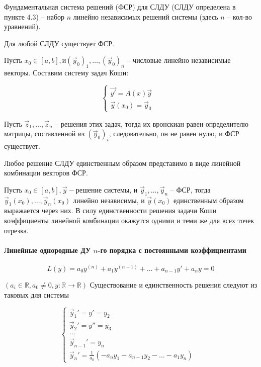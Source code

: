 \Def Фундаментальная система решений (ФСР) для СЛДУ (СЛДУ определена в пункте 4.3) -- набор $n$ линейно независимых решений системы (здесь $n$ -- кол-во уравнений).

\Lemma  Для любой СЛДУ существует ФСР.

\Proof Пусть $x_0 \in [a, b], \text{и} (\vec{y}_0)_1, \ldots , (\vec{y}_0)_n$ -- числовые линейно независимые векторы. Составим систему задач Коши:

\begin{equation*}
    \begin{cases}
        \vec{y'} = A(x)\vec{y}&\\
        \vec{y}(x_0) = \vec{y}_0 &
    \end{cases}
\end{equation*}

Пусть $\vec{z}_1, \ldots , \vec{z}_n$ -- решения этих задач, тогда их вронскиан равен определителю матрицы,
составленной из $(\vec{y}_0)_i$, следовательно, он не равен нулю, и ФСР существует.

\EndProof

\Lemma Любое решение СЛДУ единственным образом представимо в виде линейной комбинации векторов ФСР.

\Proof Пусть $x_0 \in [a, b], \vec{y} - \text{решение системы, и } \vec{y}_1, \ldots , \vec{y}_n$ -- ФСР, тогда
$\vec{y}_1(x_0), \ldots , \vec{y}_n(x_0)$ линейно независимы, и $\vec{y}(x_0)$ единственным образом выражается через
них. В силу единственности решения задачи Коши коэффициенты линейной комбинации
окажутся одними и теми же для всех точек отрезка.

\EndProof

\paragraph{Линейные однородные ДУ $n$-го порядка с постоянными коэффициентами}
\label{constcoef-equation-anchor}

\begin{equation}\label{varcoef-4}
    L(y) = a_0y^{(n)} + a_1y^{(n-1)} +\ldots + a_{n-1}y' + a_ny = 0
\end{equation}

$(a_i \in \mathbb{R}, a_0 \neq 0, y : \mathbb{R} \to \mathbb{R})$
Существование и единственность решения следуют из таковых для системы

\begin{equation*}
    \begin{cases}
        \vec{y}_1' = y' = y_2&\\
        \vec{y}_2' = y'' = y_3&\\
        \ldots&\\
        \vec{y}_{n-1}' = y_n&\\
        \vec{y}_n' = \frac{1}{a_0}(- a_ny_1 - a_{n-1}y_2 - \ldots - a_1y_n)
    \end{cases}
\end{equation*}

